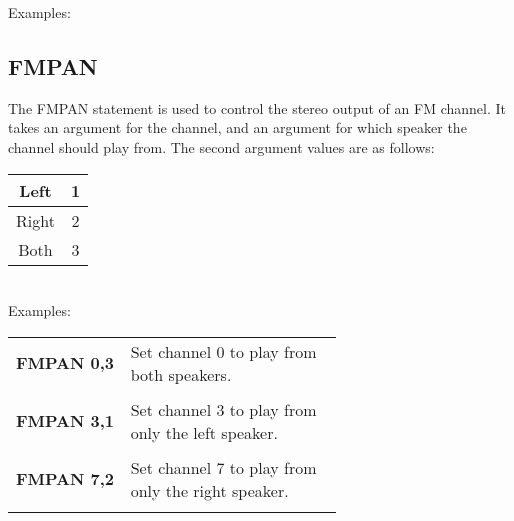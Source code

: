 Examples:\\


\subsection{FMPAN}

The {\ttfamily FMPAN} statement is used to control the stereo output of an FM
channel.  It takes an argument for the channel, and an argument for which
speaker the channel should play from.  The second argument values are as
follows:\\ 

\begin{tabular}{|c|c|}
	\hline
	Left & 1 \\ \hline
	Right & 2 \\ \hline
	Both & 3 \\ \hline
\end{tabular}\\

Examples:\\

\begin{tabular}{l p{0.65\linewidth}}

	{\ttfamily\bfseries FMPAN 0,3}&Set channel 0 to play from both speakers.\\\\

	{\ttfamily\bfseries FMPAN 3,1}&Set channel 3 to play from only the left speaker.\\\\

	{\ttfamily\bfseries FMPAN 7,2}&Set channel 7 to play from only the right speaker.\\\\

\end{tabular}

